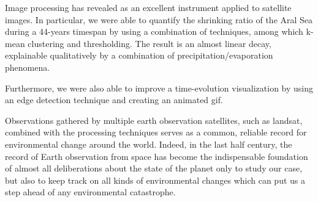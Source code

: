 Image processing has revealed as an excellent instrument applied to satellite images. 
In particular, we were able to quantify the shrinking ratio of the Aral Sea during a 44-years timespan by using a combination of techniques, among which k-mean clustering and thresholding. 
The result is an almost linear decay, explainable qualitatively by a combination of precipitation/evaporation phenomena. 

Furthermore, we were also able to improve a time-evolution visualization by using an edge detection technique and creating an animated gif. 

Observations gathered by multiple earth observation satellites, such as landsat, combined with the processing techniques serves as a common, reliable record for environmental change around the world. 
Indeed, in the last half century, the record of Earth observation from space has become the indispensable foundation of almost all deliberations about the state of the planet only to study our case, but also to keep track on all kinds of environmental changes which can put us a step ahead of any environmental catastrophe. 

